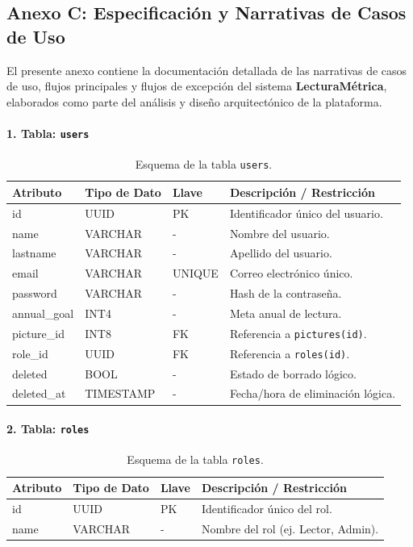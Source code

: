 \documentclass[12pt, atypical, journal]{article}
\begin{document}
\subsection*{Anexo C: Especificación y Narrativas de Casos de Uso}
El presente anexo contiene la documentación detallada de las narrativas de casos de uso, flujos principales y flujos de excepción del sistema \textbf{LecturaMétrica}, elaborados como parte del análisis y diseño arquitectónico de la plataforma. 

\paragraph{1. Tabla: \texttt{users}}
\begin{table}[H]
	\centering
	\begin{tabular}{|l|l|l|p{6.5cm}|}
		\hline
		\textbf{Atributo} & \textbf{Tipo de Dato} & \textbf{Llave} & \textbf{Descripción / Restricción} \\ \hline
		id & UUID & PK & Identificador único del usuario. \\ \hline
		name & VARCHAR & - & Nombre del usuario. \\ \hline
		lastname & VARCHAR & - & Apellido del usuario. \\ \hline
		email & VARCHAR & UNIQUE & Correo electrónico único. \\ \hline
		password & VARCHAR & - & Hash de la contraseña. \\ \hline
		annual\_goal & INT4 & - & Meta anual de lectura. \\ \hline
		picture\_id & INT8 & FK & Referencia a \texttt{pictures(id)}. \\ \hline
		role\_id & UUID & FK & Referencia a \texttt{roles(id)}. \\ \hline
		deleted & BOOL & - & Estado de borrado lógico. \\ \hline
		deleted\_at & TIMESTAMP & - & Fecha/hora de eliminación lógica. \\ \hline
	\end{tabular}
	\caption{Esquema de la tabla \texttt{users}.}
\end{table}

\paragraph{2. Tabla: \texttt{roles}}
\begin{table}[H]
	\centering
	\begin{tabular}{|l|l|l|p{6.5cm}|}
		\hline
		\textbf{Atributo} & \textbf{Tipo de Dato} & \textbf{Llave} & \textbf{Descripción / Restricción} \\ \hline
		id & UUID & PK & Identificador único del rol. \\ \hline
		name & VARCHAR & - & Nombre del rol (ej. Lector, Admin). \\ \hline
	\end{tabular}
	\caption{Esquema de la tabla \texttt{roles}.}
\end{table}
\end{document}
